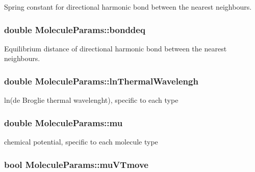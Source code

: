 Spring constant for directional harmonic bond between the nearest neighbours. 

\hypertarget{class_molecule_params_a55f6fb3edc8ca69966b06a6370f5c5c0}{
\subsubsection[{bonddeq}]{\setlength{\rightskip}{0pt plus 5cm}double Molecule\+Params\+::bonddeq}}\label{class_molecule_params_a55f6fb3edc8ca69966b06a6370f5c5c0}


Equilibrium distance of directional harmonic bond between the nearest neighbours. 

\hypertarget{class_molecule_params_af02735d94bf97e0315d370a1d2dbc675}{
\subsubsection[{ln\+Thermal\+Wavelengh}]{\setlength{\rightskip}{0pt plus 5cm}double Molecule\+Params\+::ln\+Thermal\+Wavelengh}}\label{class_molecule_params_af02735d94bf97e0315d370a1d2dbc675}


ln(de Broglie thermal wavelenght), specific to each type 

\hypertarget{class_molecule_params_a8155e1f14baf8e128df56a9a71f77de4}{
\subsubsection[{mu}]{\setlength{\rightskip}{0pt plus 5cm}double Molecule\+Params\+::mu}}\label{class_molecule_params_a8155e1f14baf8e128df56a9a71f77de4}


chemical potential, specific to each molecule type 

\hypertarget{class_molecule_params_affad94a2e0a3c67b0f36e08e867974da}{
\subsubsection[{mu\+V\+Tmove}]{\setlength{\rightskip}{0pt plus 5cm}bool Molecule\+Params\+::mu\+V\+Tmove}}\label{class_molecule_params_affad94a2e0a3c67b0f36e08e867974da}



